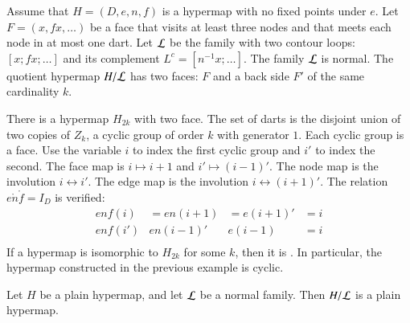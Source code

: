 \begin{example}\label{ex:H2} 
Assume that $H=(D,e,n,f)$ is a hypermap with no fixed points
under $e$.  Let $F = (x,f x,\ldots)$ be a face 
that visits at least
three nodes and that meets each node in at most one dart.
Let $\cal L$ be the
family with two contour loops:  $[x;f x;\ldots]$ and its
complement $L^c = [n^{-1} x;\ldots]$.
The family $\cal L$ is normal. The quotient hypermap $H/{\cal L}$ has
two faces: $F$ and a back side $F'$ of the same cardinality $k$.
%
\end{example}

\begin{example}[cyclic]\label{ex:H2k} 
There is a hypermap $H_{2k}$ with two face.  The set of darts is the
disjoint union of two copies of $Z_k$, a cyclic group of order $k$
with generator $1$.  Each cyclic group is a face.  Use the variable
$i$ to index the first cyclic group and $i'$ to index the second.
The face map is $i\mapsto i+1$ and $i'\mapsto (i-1)'$.  The node map
is the involution $i\leftrightarrow i'$.  The edge map is the
involution $i\leftrightarrow (i+1)'$.  The relation $e\ocirc n\ocirc
f = I_D$ is verified:
\begin{displaymath}
\begin{array}{llllllll}
enf(i) &= e n(i+1) &= e(i+1)' &= i\\
e n f (i') & e n (i-1)' & e (i-1) &= i\\
\end{array}
\end{displaymath}
If a hypermap is isomorphic to $H_{2k}$ for
some $k$, then it is .  In particular,
the hypermap constructed in the previous example is cyclic.
%
%
\end{example}

\begin{lemma}
Let $H$ be a plain hypermap, and let $\cal L$ be a
normal family.  Then $H/{\cal L}$ is a plain hypermap.
\end{lemma}

